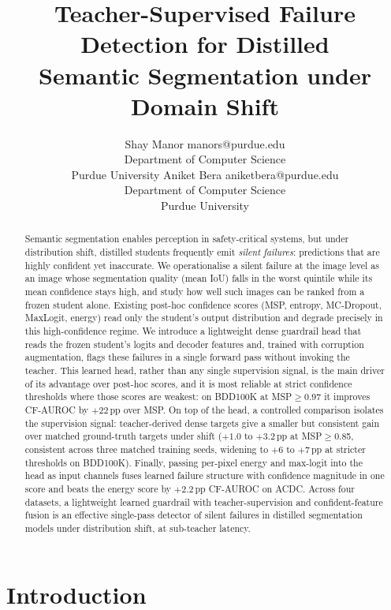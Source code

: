 \documentclass{article}
\title{Teacher-Supervised Failure Detection for Distilled\\Semantic Segmentation under Domain Shift}
\author{\name Shay Manor \email manors@purdue.edu \\
      \addr Department of Computer Science \\
      Purdue University
      \AND
      \name Aniket Bera \email aniketbera@purdue.edu \\
      \addr Department of Computer Science \\
      Purdue University}
\begin{document}
\maketitle
\raggedbottom


\begin{abstract}
Semantic segmentation enables perception in safety-critical systems, but under distribution shift, distilled students frequently emit \emph{silent failures}: predictions that are highly confident yet inaccurate. We operationalise a silent failure at the image level as an image whose segmentation quality (mean IoU) falls in the worst quintile while its mean confidence stays high, and study how well such images can be ranked from a frozen student alone. Existing post-hoc confidence scores (MSP, entropy, MC-Dropout, MaxLogit, energy) read only the student's output distribution and degrade precisely in this high-confidence regime. We introduce a lightweight dense guardrail head that reads the frozen student's logits and decoder features and, trained with corruption augmentation, flags these failures in a single forward pass without invoking the teacher. This learned head, rather than any single supervision signal, is the main driver of its advantage over post-hoc scores, and it is most reliable at strict confidence thresholds where those scores are weakest: on BDD100K at MSP$\geq$0.97 it improves CF-AUROC by $+22$\,pp over MSP. On top of the head, a controlled comparison isolates the supervision signal: teacher-derived dense targets give a smaller but consistent gain over matched ground-truth targets under shift ($+1.0$ to $+3.2$\,pp at MSP$\geq$0.85, consistent across three matched training seeds, widening to $+6$ to $+7$\,pp at stricter thresholds on BDD100K). Finally, passing per-pixel energy and max-logit into the head as input channels fuses learned failure structure with confidence magnitude in one score and beats the energy score by $+2.2$\,pp CF-AUROC on ACDC. Across four datasets, a lightweight learned guardrail with teacher-supervision and confident-feature fusion is an effective single-pass detector of silent failures in distilled segmentation models under distribution shift, at sub-teacher latency.
\end{abstract}


\section{Introduction}
\end{document}
